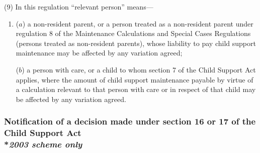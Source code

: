 \documentclass[12pt,a4paper]{article}
\begin{document}
(9) In this regulation “relevant person” means—
\begin{enumerate}\item[]
($a$) a non-resident parent, or a person treated as a non-resident parent under regulation 8 of the Maintenance Calculations and Special Cases Regulations (persons treated as non-resident parents), whose liability to pay child support maintenance may be affected by any variation agreed;

($b$) a person with care, or a child to whom section 7 of the Child Support Act applies, where the amount of child support maintenance payable by virtue of a calculation relevant to that person with care or in respect of that child may be affected by any variation agreed.
\end{enumerate}


\subsubsection[15C. Notification of a decision made under section 16 or 17 of the Child Support Act]{Notification of a decision made under section 16 or 17 of the Child Support Act\\*\emph{2003 scheme only}}
\end{document}
